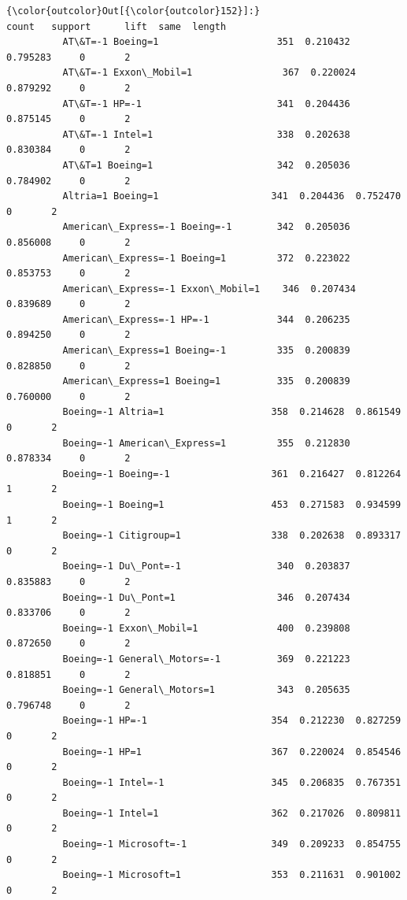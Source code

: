 \documentclass[11pt]{article}
\begin{document}
\begin{Verbatim}[commandchars=\\\{\}]
{\color{outcolor}Out[{\color{outcolor}152}]:}                                    count   support      lift  same  length
          AT\&T=-1 Boeing=1                     351  0.210432  0.795283     0       2
          AT\&T=-1 Exxon\_Mobil=1                367  0.220024  0.879292     0       2
          AT\&T=-1 HP=-1                        341  0.204436  0.875145     0       2
          AT\&T=-1 Intel=1                      338  0.202638  0.830384     0       2
          AT\&T=1 Boeing=1                      342  0.205036  0.784902     0       2
          Altria=1 Boeing=1                    341  0.204436  0.752470     0       2
          American\_Express=-1 Boeing=-1        342  0.205036  0.856008     0       2
          American\_Express=-1 Boeing=1         372  0.223022  0.853753     0       2
          American\_Express=-1 Exxon\_Mobil=1    346  0.207434  0.839689     0       2
          American\_Express=-1 HP=-1            344  0.206235  0.894250     0       2
          American\_Express=1 Boeing=-1         335  0.200839  0.828850     0       2
          American\_Express=1 Boeing=1          335  0.200839  0.760000     0       2
          Boeing=-1 Altria=1                   358  0.214628  0.861549     0       2
          Boeing=-1 American\_Express=1         355  0.212830  0.878334     0       2
          Boeing=-1 Boeing=-1                  361  0.216427  0.812264     1       2
          Boeing=-1 Boeing=1                   453  0.271583  0.934599     1       2
          Boeing=-1 Citigroup=1                338  0.202638  0.893317     0       2
          Boeing=-1 Du\_Pont=-1                 340  0.203837  0.835883     0       2
          Boeing=-1 Du\_Pont=1                  346  0.207434  0.833706     0       2
          Boeing=-1 Exxon\_Mobil=1              400  0.239808  0.872650     0       2
          Boeing=-1 General\_Motors=-1          369  0.221223  0.818851     0       2
          Boeing=-1 General\_Motors=1           343  0.205635  0.796748     0       2
          Boeing=-1 HP=-1                      354  0.212230  0.827259     0       2
          Boeing=-1 HP=1                       367  0.220024  0.854546     0       2
          Boeing=-1 Intel=-1                   345  0.206835  0.767351     0       2
          Boeing=-1 Intel=1                    362  0.217026  0.809811     0       2
          Boeing=-1 Microsoft=-1               349  0.209233  0.854755     0       2
          Boeing=-1 Microsoft=1                353  0.211631  0.901002     0       2

\end{Verbatim}
\end{document}
